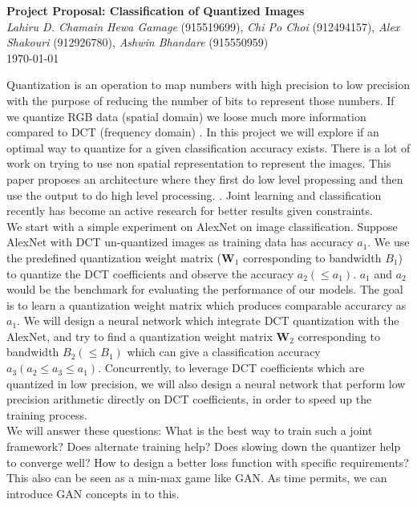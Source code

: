 \documentclass{article}
\begin{document}
\begin{center}
	\Large{\bf{Project Proposal:
	Classification of Quantized Images}}\\ { \small \textit{Lahiru D. Chamain Hewa Gamage} (915519699)}, {\small \textit{Chi Po Choi} (912494157)}, {\small \textit{Alex Shakouri} (912926780)}, {\small \textit{Ashwin Bhandare} (915550959)} \\
	 {\small \today}
\end{center}

Quantization is an operation to map numbers with high precision to low precision with the purpose of reducing the number of bits to represent those numbers. If we quantize RGB data (spatial domain) we loose much more information compared to DCT (frequency domain) \cite{rao2014discrete}. In this project we will explore if an optimal way to quantize for a given classification accuracy exists. There is a lot of work on trying to use non spatial representation to represent the images. This paper proposes an architecture where they first do low level propessing and then use the output to do high level processing. \cite{DBLP:journals/corr/DiamondSBWH17}. Joint learning and classification \cite{jouppi2017datacenter, micikevicius2017mixed} recently has become an active research for better results given constraints.\\

We start with a simple experiment on AlexNet on image classification. Suppose AlexNet with DCT un-quantized images as training data has accuracy $a_1$. We use the predefined quantization weight matrix ($\mathbf{W}_1$ corresponding to bandwidth $B_1$) to quantize the DCT coefficients and observe the accuracy $a_2 (\le a_1)$. $a_1$ and $a_2$ would be the benchmark for evaluating the performance of our models. The goal is to learn a quantization weight matrix which produces comparable accurarcy as $a_1$. We will design a neural network which integrate DCT quantization with the AlexNet, and try to find a quantization weight matrix $\mathbf{W}_2$ corresponding to bandwidth $B_2 (\le B_1)$ which can give a classification accuracy $a_3 (a_2 \le a_3 \leq a_1)$. Concurrently, to leverage DCT coefficients which are quantized in low precision, we will also design a neural network that perform low precision arithmetic directly on DCT coefficients, in order to speed up the training process.\\

We will answer these questions: What is the best way to train such a joint framework? Does alternate training help? Does slowing down the quantizer help to converge well? How to design a better loss function with specific requirements? This also can be seen as a min-max game like GAN. As time permits, we can introduce GAN concepts in to this.\\
\end{document}
